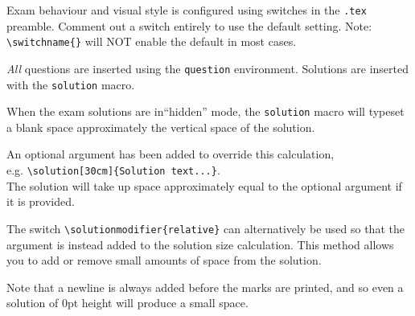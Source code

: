 \documentclass[12pt,a4paper]{article} %
\begin{document}
\makefront					%

\begin{question}{5}			%
Exam behaviour and visual style is configured using switches in the \texttt{.tex} preamble.
Comment out a switch entirely to use the default setting. Note: \texttt{\textbackslash switchname\{\}} will NOT enable the default in most cases.

\textit{All} questions are inserted using the \texttt{question} environment. Solutions are inserted with the \texttt{solution} macro.

\end{question}

\begin{question}{5}			%
When the exam solutions are in``hidden'' mode, the \texttt{solution} macro will typeset a blank space approximately the vertical space of the solution. 

An optional argument has been added to override this calculation, \\e.g. \texttt{\textbackslash solution[30cm]\{Solution text...\}}.\\ The solution will take up space approximately equal to the optional argument if it is provided.

The switch \texttt{\textbackslash solutionmodifier\{relative\}} can alternatively be used so that the argument is instead added to the solution size calculation. This method allows you to add or remove small amounts of space from the solution.

Note that a newline is always added before the marks are printed, and so even a solution of 0pt height will produce a small space.
\end{question}
\end{document}
